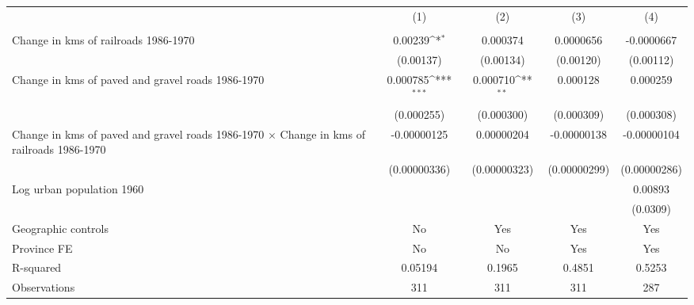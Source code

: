 {
\def\sym#1{\ifmmode^{#1}\else\(^{#1}\)\fi}
\begin{tabular}{l*{4}{c}}
\hline\hline
                &\multicolumn{1}{c}{(1)}&\multicolumn{1}{c}{(2)}&\multicolumn{1}{c}{(3)}&\multicolumn{1}{c}{(4)}\\
                &\multicolumn{1}{c}{}&\multicolumn{1}{c}{}&\multicolumn{1}{c}{}&\multicolumn{1}{c}{}\\
\hline
Change in kms of railroads 1986-1970&  0.00239\sym{*}  & 0.000374         &0.0000656         &-0.0000667         \\
                &(0.00137)         &(0.00134)         &(0.00120)         &(0.00112)         \\
[1em]
Change in kms of paved and gravel roads 1986-1970& 0.000785\sym{***}& 0.000710\sym{**} & 0.000128         & 0.000259         \\
                &(0.000255)         &(0.000300)         &(0.000309)         &(0.000308)         \\
[1em]
Change in kms of paved and gravel roads 1986-1970 $\times$ Change in kms of railroads 1986-1970&-0.00000125         &0.00000204         &-0.00000138         &-0.00000104         \\
                &(0.00000336)         &(0.00000323)         &(0.00000299)         &(0.00000286)         \\
[1em]
Log urban population 1960&                  &                  &                  &  0.00893         \\
                &                  &                  &                  & (0.0309)         \\
\hline
Geographic controls&       No         &      Yes         &      Yes         &      Yes         \\
Province FE     &       No         &       No         &      Yes         &      Yes         \\
R-squared       &  0.05194         &   0.1965         &   0.4851         &   0.5253         \\
Observations    &      311         &      311         &      311         &      287         \\
\hline\hline
\end{tabular}
}
